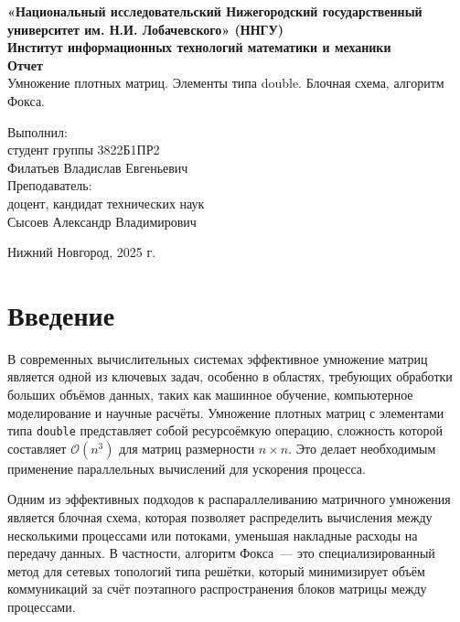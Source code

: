 \documentclass[12pt]{article}
\begin{document}
\thispagestyle{empty}
\begin{center}
    {\bfseries
    {\large «Национальный исследовательский Нижегородский государственный университет им.
Н.И. Лобачевского» (ННГУ) }\\[2em]
    {\large Институт информационных технологий математики и механики }\\[1em]
    }
    \vspace*{\fill} 
    {\LARGE\bfseries Отчет}\\[1em]
    {\large Умножение плотных матриц. Элементы типа double. Блочная схема, алгоритм Фокса.}\\[5em]
    \vspace{\fill} 
     \hfill\parbox{0.4\textwidth}{
        Выполнил:\\
        студент группы 3822Б1ПР2\\
        Филатьев Владислав Евгеньевич\\[2em]
        Преподаватель:\\
        доцент, кандидат технических наук\\
        Сысоев Александр Владимирович\\[2em]
    }

    Нижний Новгород, 2025 г.
\end{center}
\newpage

\tableofcontents
\newpage

\section{Введение}
В современных вычислительных системах эффективное умножение матриц является одной из ключевых задач, особенно в областях, требующих обработки больших объёмов данных, таких как машинное обучение, компьютерное моделирование и научные расчёты. Умножение плотных матриц с элементами типа \texttt{double} представляет собой ресурсоёмкую операцию, сложность которой составляет $\mathcal{O}(n^3)$ для матриц размерности $n \times n$. Это делает необходимым применение параллельных вычислений для ускорения процесса.

Одним из эффективных подходов к распараллеливанию матричного умножения является блочная схема, которая позволяет распределить вычисления между несколькими процессами или потоками, уменьшая накладные расходы на передачу данных. В частности, алгоритм Фокса~--- это специализированный метод для сетевых топологий типа решётки, который минимизирует объём коммуникаций за счёт поэтапного распространения блоков матрицы между процессами.
\end{document}
